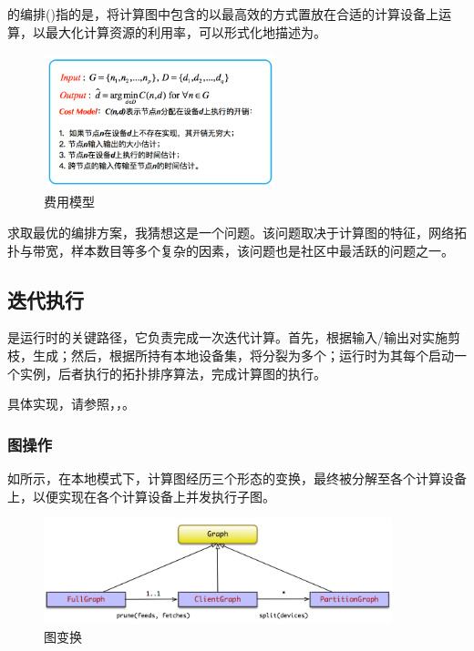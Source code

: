\begin{content}
的编排()指的是，将计算图中包含的以最高效的方式置放在合适的计算设备上运算，以最大化计算资源的利用率，可以形式化地描述为。

\begin{figure}[H]
\centering
\includegraphics[width=0.6\textwidth]{figures/local-cost-model.png}
\caption{费用模型}
 \label{fig:local-cost-model}
\end{figure}

求取最优的编排方案，我猜想这是一个问题。该问题取决于计算图的特征，网络拓扑与带宽，样本数目等多个复杂的因素，该问题也是社区中最活跃的问题之一。

\subsection{迭代执行}

是\tf{}运行时的关键路径，它负责完成一次迭代计算。首先，根据输入/输出对实施剪枝，生成；然后，根据所持有本地设备集，将分裂为多个；运行时为其每个启动一个实例，后者执行的拓扑排序算法，完成计算图的执行。

具体实现，请参照，，。

\subsubsection{图操作}

如所示，在本地模式下，计算图经历三个形态的变换，最终被分解至各个计算设备上，以便实现在各个计算设备上并发执行子图。

\begin{figure}[H]
\centering
\includegraphics[width=0.9\textwidth]{figures/local-graph-transformation.png}
\caption{图变换}
 \label{fig:local-graph-transformation}
\end{figure}


\end{content}
